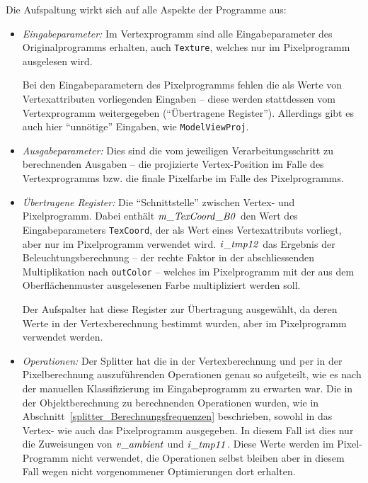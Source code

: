 \documentclass[twoside,a4paper,fleqn,12pt]{book}
\begin{document}
Die Aufspaltung wirkt sich auf alle Aspekte der Programme aus:
\begin{itemize}
\item \emph{Eingabeparameter:} Im Vertexprogramm sind alle Eingabeparameter des Originalprogramms erhalten,
auch \texttt{Texture}, welches nur im Pixelprogramm ausgelesen wird.

Bei den Eingabeparametern des Pixelprogramms fehlen die als Werte von Vertexattributen vorliegenden Eingaben -- diese werden
stattdessen vom Vertexprogramm weitergegeben ("`Übertragene Register"'). Allerdings gibt es auch
hier "`unnötige"' Eingaben, wie \texttt{ModelViewProj}. 

\item \emph{Ausgabeparameter:} Dies sind die vom jeweiligen Verarbeitungsschritt zu berechnenden Ausgaben --
die projizierte Vertex-Position im Falle des Vertexprogramms bzw. die finale Pixelfarbe im Falle des
Pixelprogramms.

\item \emph{Übertragene Register:} Die "`Schnittstelle"' zwischen Vertex- und Pixelprogramm.
Dabei enthält $\mathit{m\_TexCoord\_B0}$ den Wert des Eingabeparameters \texttt{TexCoord}, der als Wert eines Vertexattributs vorliegt,
aber nur im Pixelprogramm verwendet wird. $\mathit{i\_tmp12}$ das Ergebnis der Beleuchtungsberechnung
-- der rechte Faktor in der abschliessenden Multiplikation nach \texttt{outColor} --
welches im Pixelprogramm mit der aus dem Oberflächenmuster ausgelesenen Farbe multipliziert werden soll.

Der Aufspalter hat diese Register zur Übertragung ausgewählt, da deren Werte in der Vertexberechnung bestimmt wurden,
aber im Pixelprogramm verwendet werden.

\item \emph{Operationen:} Der Splitter hat die in der Vertexberechnung und per in der Pixelberechnung auszuführenden Operationen
genau so aufgeteilt, wie es nach der manuellen Klassifizierung im Eingabeprogramm zu erwarten war.
Die in der Objektberechnung zu berechnenden Operationen wurden, wie in Abschnitt~\ref{splitter_Berechnungsfrequenzen}
beschrieben, sowohl in das Vertex- wie auch das Pixelprogramm ausgegeben. In diesem Fall ist dies
nur die Zuweisungen von $\mathit{v\_ambient}$ und $\mathit{i\_tmp11}$. Diese Werte werden im Pixel-Programm nicht verwendet,
die Operationen selbst bleiben aber in diesem Fall wegen nicht vorgenommener Optimierungen dort erhalten.

\end{itemize}
\end{document}
